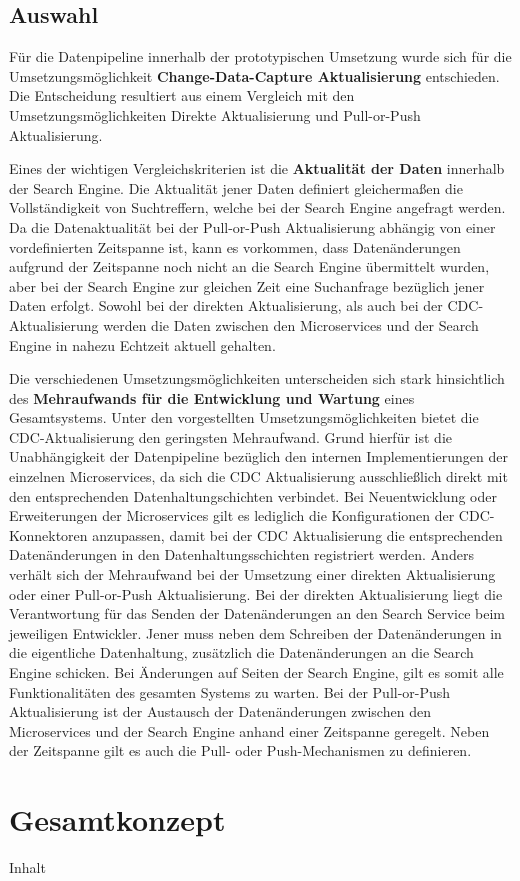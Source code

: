 \subsection{Auswahl\label{subsec4.3.5:Unterunterpunkt-5}}

Für die Datenpipeline innerhalb der prototypischen Umsetzung wurde sich für die Umsetzungsmöglichkeit \glqq \textbf{Change-Data-Capture Aktualisierung}\grqq{} entschieden. Die Entscheidung resultiert aus einem Vergleich mit den Umsetzungsmöglichkeiten \glqq Direkte Aktualisierung\grqq{} und \glqq Pull-or-Push Aktualisierung\grqq{}.

Eines der wichtigen Vergleichskriterien ist die \textbf{Aktualität der Daten} innerhalb der Search Engine. Die Aktualität jener Daten definiert gleichermaßen die Vollständigkeit von Suchtreffern, welche bei der Search Engine angefragt werden. Da die Datenaktualität bei der Pull-or-Push Aktualisierung abhängig von einer vordefinierten Zeitspanne ist, kann es vorkommen, dass Datenänderungen aufgrund der Zeitspanne noch nicht an die Search Engine übermittelt wurden, aber bei der Search Engine zur gleichen Zeit eine Suchanfrage bezüglich jener Daten erfolgt. Sowohl bei der direkten Aktualisierung, als auch bei der CDC-Aktualisierung werden die Daten zwischen den Microservices und der Search Engine in nahezu Echtzeit aktuell gehalten.

Die verschiedenen Umsetzungsmöglichkeiten unterscheiden sich stark hinsichtlich des \textbf{Mehraufwands für die Entwicklung und Wartung} eines Gesamtsystems. Unter den vorgestellten Umsetzungsmöglichkeiten bietet die CDC-Aktualisierung den geringsten Mehraufwand. Grund hierfür ist die Unabhängigkeit der Datenpipeline bezüglich den internen Implementierungen der einzelnen Microservices, da sich die CDC Aktualisierung ausschließlich direkt mit den entsprechenden Datenhaltungschichten verbindet. Bei Neuentwicklung oder Erweiterungen der Microservices gilt es lediglich die Konfigurationen der CDC-Konnektoren anzupassen, damit bei der CDC Aktualisierung die entsprechenden Datenänderungen in den Datenhaltungsschichten registriert werden. Anders verhält sich der Mehraufwand bei der Umsetzung einer direkten Aktualisierung oder einer Pull-or-Push Aktualisierung. Bei der direkten Aktualisierung liegt die Verantwortung für das Senden der Datenänderungen an den Search Service beim jeweiligen Entwickler. Jener muss neben dem Schreiben der Datenänderungen in die eigentliche Datenhaltung, zusätzlich die Datenänderungen an die Search Engine schicken. Bei Änderungen auf Seiten der Search Engine, gilt es somit alle Funktionalitäten des gesamten Systems zu warten. Bei der Pull-or-Push Aktualisierung ist der Austausch der Datenänderungen zwischen den Microservices und der Search Engine anhand einer Zeitspanne geregelt. Neben der Zeitspanne gilt es auch die Pull- oder Push-Mechanismen zu definieren.

\section{Gesamtkonzept\label{sec4.4:Unterpunkt-4}}

Inhalt